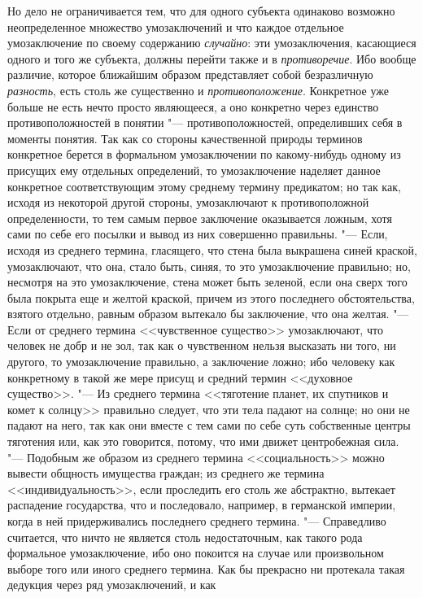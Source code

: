 Но дело не ограничивается тем, что для одного субъекта
одинаково возможно неопределенное множество умозаключений и что каждое
отдельное умозаключение по своему содержанию
{\em случайно}: эти
умозаключения, касающиеся одного и того же субъекта, должны перейти также и
в {\em противоречие}. Ибо
вообще различие, которое ближайшим образом представляет собой безразличную
{\em разность}, есть
столь же существенно и
{\em противоположение}.
Конкретное уже больше не есть нечто просто являющееся, а оно
конкретно через единство противоположностей в понятии
"--- противоположностей, определивших себя в моменты понятия.
Так как со стороны качественной природы терминов конкретное берется в
формальном умозаключении по какому-нибудь одному из присущих ему отдельных
определений, то умозаключение наделяет данное конкретное соответствующим
этому среднему термину предикатом; но так как, исходя из некоторой другой
стороны, умозаключают к противоположной определенности, то тем самым первое
заключение оказывается ложным, хотя сами по себе его посылки и вывод из них
совершенно правильны. "--- Если, исходя из среднего термина,
гласящего, что стена была выкрашена синей краской, умозаключают, что она,
стало быть, синяя, то это умозаключение правильно; но, несмотря на это
умозаключение, стена может быть зеленой, если она сверх того была покрыта
еще и желтой краской, причем из этого последнего обстоятельства, взятого
отдельно, равным образом вытекало бы заключение, что она
желтая. "--- Если от среднего термина <<чувственное существо>>
умозаключают, что человек не добр и не зол, так как о чувственном нельзя
высказать ни того, ни другого, то умозаключение правильно, а заключение
ложно; ибо человеку как конкретному в такой же мере присущ и средний термин
<<духовное существо>>. "--- Из среднего термина <<тяготение
планет, их спутников и комет к солнцу>> правильно следует, что эти тела
падают на солнце; но они не падают на него, так как они вместе с тем сами
по себе суть собственные центры тяготения или, как это говорится, потому,
что ими движет центробежная сила. "--- Подобным же образом из
среднего термина <<социальность>> можно вывести общность имущества граждан;
из среднего же термина <<индивидуальность>>, если проследить его столь же
абстрактно, вытекает распадение государства, что и последовало, например, в
германской империи, когда в ней придерживались последнего среднего
термина. "--- Справедливо считается, что ничто не является
столь недостаточным, как такого рода формальное умозаключение, ибо оно
покоится на случае или произвольном выборе того или иного среднего термина.
Как бы прекрасно ни протекала такая дедукция через ряд умозаключений, и как
